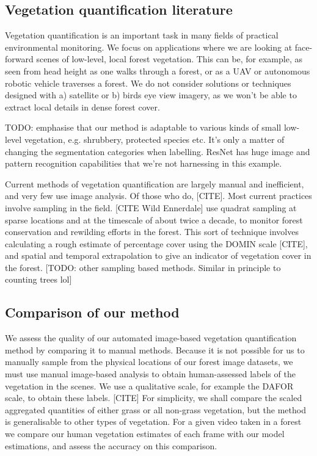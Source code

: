 \subsection{Vegetation quantification literature}
Vegetation quantification is an important task in many fields of practical environmental monitoring. We focus on applications where we are looking at face-forward scenes of low-level, local forest vegetation. This can be, for example, as seen from head height as one walks through a forest, or as a UAV or autonomous robotic vehicle traverses a forest. We do not consider solutions or techniques designed with a) satellite or b) birds eye view imagery, as we won't be able to extract local details in dense forest cover. 

TODO: emphasise that our method is adaptable to various kinds of small low-level vegetation, e.g. shrubbery, protected species etc. It's only a matter of changing the segmentation categories when labelling. ResNet has huge image and pattern recognition capabilities that we're not harnessing in this example.

Current methods of vegetation quantification are largely manual and inefficient, and very few use image analysis. Of those who do, [CITE]. Most current practices involve sampling in the field.  [CITE Wild Ennerdale] use quadrat sampling at sparse locations and at the timescale of about twice a decade, to monitor forest conservation and rewilding efforts in the forest. This sort of technique involves calculating a rough estimate of percentage cover using the DOMIN scale [CITE], and spatial and temporal extrapolation to give an indicator of vegetation cover in the forest. [TODO: other sampling based methods. Similar in principle to counting trees lol]

\subsection{Comparison of our method}
We assess the quality of our automated image-based vegetation quantification method by comparing it to manual methods. Because it is not possible for us to manually sample from the physical locations of our forest image datasets, we must use manual image-based analysis to obtain human-assessed labels of the vegetation in the scenes. We use a qualitative scale, for example the DAFOR scale, to obtain these labels. [CITE] For simplicity, we shall compare the scaled aggregated quantities of either grass or all non-grass vegetation, but the method is generalisable to other types of vegetation. For a given video taken in a forest we compare our human vegetation estimates of each frame with our model estimations, and assess the accuracy on this comparison.

